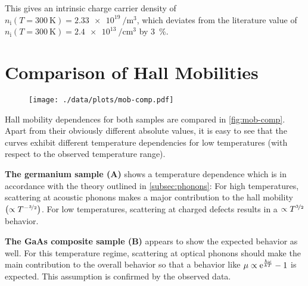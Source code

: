 This gives an intrinsic charge carrier density of $n_\text{i} (T=\SI{300}{\kelvin}) = \SI{2.33e19}{\per\meter\cubed}$, which deviates from the literature value of $n_\text{i} (T=\SI{300}{\kelvin}) = \SI{2.4e13}{\per\centi\meter\cubed}$ by \SI{3}{\percent}.

\section{Comparison of Hall Mobilities}
\begin{figure}
  \centering
  \texttt{[image: ./data/plots/mob-comp.pdf]}
  \label{fig:mob-comp}
\end{figure}

Hall mobility dependences for both samples are compared in \autoref{fig:mob-comp}.
Apart from their obviously different absolute values, it is easy to see that the curves exhibit different temperature dependencies for low temperatures (with respect to the observed temperature range).

\textbf{The germanium sample (A)} shows a temperature dependence which is in accordance with the theory outlined in \autoref{subsec:phonons}: For high temperatures, scattering at acoustic phonons makes a major contribution to the hall mobility $\left(\propto T^{-\nicefrac{3}{2}}\right)$.
For low temperatures, scattering at charged defects results in a $\propto T^{\nicefrac{3}{2}}$ behavior.

\textbf{The GaAs composite sample (B)} appears to show the expected behavior as well.
For this temperature regime, scattering at optical phonons should make the main contribution to the overall behavior so that a behavior like $\mu\propto \mathrm{e}^\frac{\hbar \omega}{k T} - 1$ is expected.
This assumption is confirmed by the observed data.
